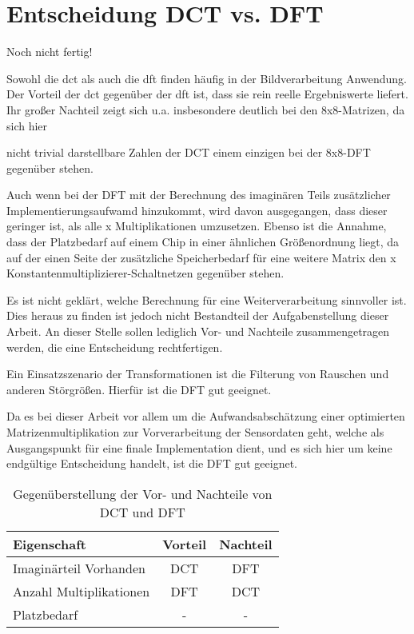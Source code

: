  \section{Entscheidung DCT vs. DFT}
 Noch nicht fertig!
 
 Sowohl die \gls{dct} als auch die \gls{dft} finden häufig in der Bildverarbeitung Anwendung. Der Vorteil der \gls{dct} gegenüber der \gls{dft} ist,
 dass sie rein reelle Ergebniswerte liefert. Ihr großer Nachteil zeigt sich u.a. insbesondere deutlich bei den 8x8-Matrizen, da sich hier 
 
 
 nicht trivial darstellbare Zahlen der DCT einem einzigen bei der 8x8-DFT gegenüber stehen.
 

Auch wenn bei der DFT mit der Berechnung des imaginären Teils zusätzlicher Implementierungsaufwamd hinzukommt, wird davon ausgegangen, dass dieser geringer ist, 
 als alle x Multiplikationen umzusetzen. Ebenso ist die Annahme, dass der Platzbedarf auf einem Chip in einer ähnlichen Größenordnung liegt, da auf der einen Seite
 der zusätzliche Speicherbedarf für eine weitere Matrix den x Konstantenmultiplizierer-Schaltnetzen gegenüber stehen.
 
 Es ist nicht geklärt, welche Berechnung für eine Weiterverarbeitung sinnvoller ist. Dies heraus zu finden ist jedoch nicht Bestandteil der Aufgabenstellung dieser Arbeit.
 An dieser Stelle sollen lediglich Vor- und Nachteile zusammengetragen werden, die eine Entscheidung rechtfertigen.
 
 Ein Einsatzszenario der Transformationen ist die Filterung von Rauschen und anderen Störgrößen. Hierfür ist die DFT gut geeignet. 
 
 
 Da es bei dieser Arbeit vor allem um die Aufwandsabschätzung einer optimierten Matrizenmultiplikation zur Vorverarbeitung der Sensordaten geht, 
 welche als Ausgangspunkt für eine finale Implementation dient, und es sich hier um keine endgültige Entscheidung handelt, ist die DFT gut geeignet.
 
 
 \begin{table}[ht]
 \centering
  \caption{Gegenüberstellung der Vor- und Nachteile von DCT und DFT}
  \begin{tabular}{lcc}
  \hline
      Eigenschaft          & Vorteil   & Nachteil\\
  \hline
   Imaginärteil Vorhanden  & DCT       & DFT \\
   Anzahl Multiplikationen & DFT       & DCT\\
   Platzbedarf             &  -        &  - \\
   \hline
  \end{tabular}
  \label{tab:gegenüberstellung_dct_dft}
 \end{table}
